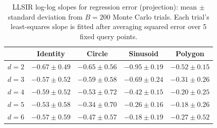 \begin{table}[htbp]
\small
\centering
\begin{tabular}{lcccc}
\toprule
 & Identity & Circle & Sinusoid & Polygon \\
\midrule
$d=2$ & $-0.67 \pm 0.49$ & $-0.65 \pm 0.56$ & $-0.95 \pm 0.19$ & $-0.52 \pm 0.15$ \\
$d=3$ & $-0.57 \pm 0.52$ & $-0.59 \pm 0.58$ & $-0.69 \pm 0.24$ & $-0.31 \pm 0.26$ \\
$d=4$ & $-0.59 \pm 0.52$ & $-0.53 \pm 0.72$ & $-0.42 \pm 0.15$ & $-0.20 \pm 0.25$ \\
$d=5$ & $-0.53 \pm 0.58$ & $-0.34 \pm 0.70$ & $-0.26 \pm 0.16$ & $-0.18 \pm 0.26$ \\
$d=6$ & $-0.57 \pm 0.59$ & $-0.47 \pm 0.57$ & $-0.18 \pm 0.19$ & $-0.27 \pm 0.52$ \\
\bottomrule
\end{tabular}
\caption{LLSIR log-log slopes for regression error (projection): mean $\pm$ standard deviation from $B=200$ Monte Carlo trials. Each trial's least-squares slope is fitted after averaging squared error over 5 fixed query points. }
\label{tab:reg}
\end{table}
